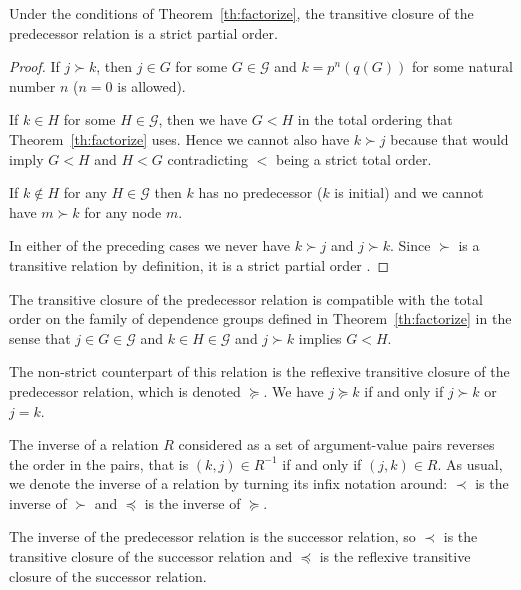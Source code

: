 \begin{theorem} \label{th:transitive-closure}
Under the conditions of Theorem~\ref{th:factorize},
the transitive closure of the predecessor relation is a strict partial order.
\end{theorem}
\begin{proof}
If $j \succ k$, then $j \in G$ for some $G \in \mathcal{G}$ and
$k = p^n(q(G))$ for some natural number $n$ ($n = 0$ is allowed).

If $k \in H$ for some $H \in \mathcal{G}$,
then we have $G < H$ in the total ordering
that Theorem~\ref{th:factorize} uses.
Hence we cannot also have $k \succ j$ because that would imply $G < H$
and $H < G$ contradicting $<$ being a strict total order.

If $k \notin H$ for any $H \in \mathcal{G}$ then $k$ has no predecessor
($k$ is initial) and we cannot have $m \succ k$ for any node $m$.

In either of the preceding cases we never have $k \succ j$ and $j \succ k$.
Since $\succ$ is a transitive relation by definition, it is
a strict partial order \citep[Section~14]{halmos-set-theory}.
\end{proof}
\begin{corollary} \label{cor:compatible}
The transitive closure of the predecessor relation is compatible with
the total order on the family of dependence groups defined
in Theorem~\ref{th:factorize} in the sense that
$j \in G \in \mathcal{G}$ and $k \in H \in \mathcal{G}$ and $j \succ k$
implies $G < H$.
\end{corollary}

The non-strict counterpart of this relation
is the reflexive transitive closure of the predecessor relation,
which is denoted $\succeq$.
We have $j \succeq k$ if and only if $j \succ k$ or $j = k$.

The inverse of a relation $R$ considered as a set of argument-value pairs
reverses the order in the pairs, that is $(k, j) \in R^{- 1}$ if and only
if $(j, k) \in R$.
As usual, we denote the inverse of a relation by turning its infix notation
around: $\prec$ is the inverse of $\succ$ and $\preceq$ is the inverse
of $\succeq$.

The inverse of the predecessor relation is the successor relation,
so $\prec$ is the transitive closure of the successor relation
and $\preceq$ is the reflexive transitive closure of the successor relation.

